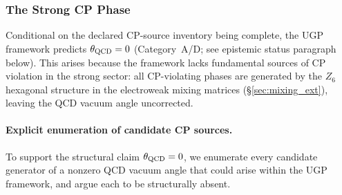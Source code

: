 \documentclass[11pt]{article}
\theoremstyle{remark}
\begin{document}
\subsubsection{The Strong CP Phase}

Conditional on the declared CP-source inventory being complete, the UGP framework predicts $\theta_{\rm QCD} = 0$ (Category~A/D; see epistemic status paragraph below).
This arises because the framework lacks fundamental sources of CP violation in the strong sector: all CP-violating phases are generated by the $Z_6$ hexagonal structure in the electroweak mixing matrices (\S\ref{sec:mixing_ext}), leaving the QCD vacuum angle uncorrected.

\paragraph{Explicit enumeration of candidate CP sources.}
To support the structural claim $\theta_{\rm QCD} = 0$, we enumerate every candidate generator of a nonzero QCD vacuum angle that could arise within the UGP framework, and argue each to be structurally absent.
\end{document}
